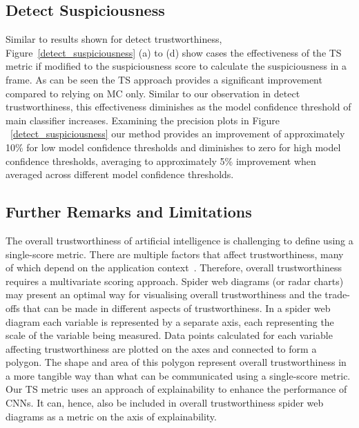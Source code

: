 \subsection{Detect Suspiciousness} 
Similar to results shown for detect trustworthiness, Figure~\ref{detect_suspiciousness} (a) to (d) show cases the effectiveness of the TS metric if modified to the suspiciousness score to calculate the suspiciousness in a frame. 
As can be seen the TS approach provides a significant improvement compared to relying on MC only. Similar to our observation in detect trustworthiness, this effectiveness diminishes as the model confidence threshold of main classifier increases.
%
Examining the precision plots in Figure ~\ref{detect_suspiciousness} our method provides an improvement of approximately 10\% for low model confidence thresholds and diminishes to zero for high model confidence thresholds, averaging to approximately 5\% improvement when averaged across different model confidence thresholds.

\subsection{Further Remarks and Limitations}
The overall trustworthiness of artificial intelligence is challenging to define using a single-score metric. 
%
There are multiple factors that affect trustworthiness, many of which depend on the application context~\cite{Wing2021,9142644,thiebes2021trustworthy}. 
%
Therefore, overall trustworthiness requires a multivariate scoring approach. Spider web diagrams (or radar charts) may present an optimal way for visualising overall trustworthiness and the trade-offs that can be made in different aspects of trustworthiness. 
%
In a spider web diagram each variable is represented by a separate axis, each representing the scale of the variable being measured.
%
Data points calculated for each variable affecting trustworthiness are plotted on the axes and connected to form a polygon.
%
The shape and area of this polygon represent overall trustworthiness in a more tangible way than what can be communicated  using a single-score metric.
%
Our TS metric uses an approach of explainability to enhance the performance of CNNs. It can, hence, also be included in overall trustworthiness spider web diagrams as a metric on the axis of explainability.

